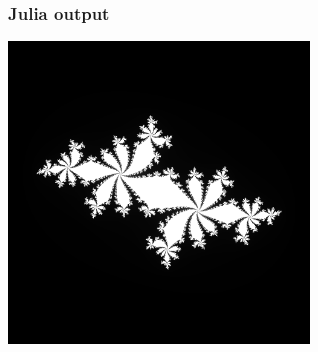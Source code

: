 \documentclass[9pt]{beamer}
\begin{document}
\begin{frame}
  \frametitle{Julia output}
  \centering
  \includegraphics[width=0.6\textwidth]{julia_example_greyscale.png}
\end{frame}
\end{document}

